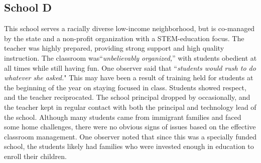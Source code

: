 \documentclass{sigchi}
\begin{document}

\subsection{School D}
This school serves a racially diverse low-income neighborhood, but is co-managed by the state and a non-profit organization with a STEM-education focus. The teacher was highly prepared, providing strong support and high quality instruction. The classroom was``\emph{unbelievably organized,}'' with students obedient at all times while still having fun. One observer said that ``\emph{students would rush to do whatever she asked.}" This may have been a result of training held for students at the beginning of the year on staying focused in class. Students showed respect, and the teacher reciprocated. The school principal dropped by occasionally, and the teacher kept in regular contact with both the principal and technology lead of the school. Although many students came from immigrant families and faced some home challenges, there were no obvious signs of issues based on the effective classroom management. One observer noted that since this was a specially funded school, the students likely had families who were invested enough in education to enroll their children.
\end{document}
